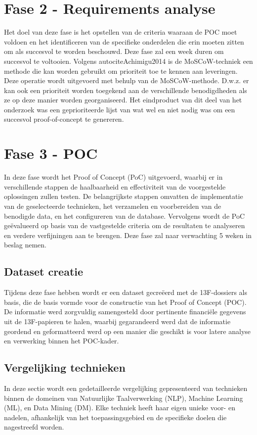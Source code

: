 \section{Fase 2 - Requirements analyse}
Het doel van deze fase is het opstellen van de criteria waaraan de POC moet voldoen en het identificeren van de specifieke onderdelen die erin moeten zitten om als succesvol te worden beschouwd. Deze fase zal een week duren om succesvol te voltooien. Volgens autocite{Achimigu2014} is de MoSCoW-techniek een methode die kan worden gebruikt om prioriteit toe te kennen aan leveringen. Deze operatie wordt uitgevoerd met behulp van de MoSCoW-methode. D.w.z. er kan ook een prioriteit worden toegekend aan de verschillende benodigdheden als ze op deze manier worden georganiseerd. Het eindproduct van dit deel van het onderzoek was een geprioriteerde lijst van wat wel en niet nodig was om een succesvol proof-of-concept te genereren. 

\section{Fase 3 - POC}  
In deze fase wordt het Proof of Concept (PoC) uitgevoerd, waarbij er in verschillende stappen de haalbaarheid en effectiviteit van de voorgestelde oplossingen zullen testen. De belangrijkste stappen omvatten de implementatie van de geselecteerde technieken, het verzamelen en voorbereiden van de benodigde data, en het configureren van de database. Vervolgens wordt de PoC geëvalueerd op basis van de vastgestelde criteria om de resultaten te analyseren en verdere verfijningen aan te brengen. Deze fase zal naar verwachting 5 weken in beslag nemen.
\subsection{Dataset creatie}
Tijdens deze fase hebben wordt er een dataset gecreëerd met de 13F-dossiers als basis, die de basis vormde voor de constructie van het Proof of Concept (POC). De informatie werd zorgvuldig samengesteld door pertinente financiële gegevens uit de 13F-papieren te halen, waarbij gegarandeerd werd dat de informatie geordend en geformatteerd werd op een manier die geschikt is voor latere analyse en verwerking binnen het POC-kader.

\subsection{Vergelijking technieken}
In deze sectie wordt een gedetailleerde vergelijking gepresenteerd van technieken binnen de domeinen van Natuurlijke Taalverwerking (NLP), Machine Learning (ML), en Data Mining (DM). Elke techniek heeft haar eigen unieke voor- en nadelen, afhankelijk van het toepassingsgebied en de specifieke doelen die nagestreefd worden.

